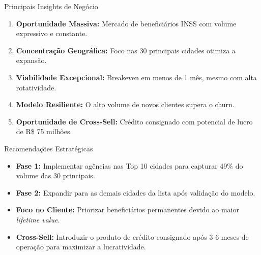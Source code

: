 \documentclass{beamer}
\begin{document}
\begin{frame}{Principais Insights de Negócio}
  \begin{enumerate}
    \item \textbf{Oportunidade Massiva:} Mercado de beneficiários INSS com volume expressivo e constante.
    \item \textbf{Concentração Geográfica:} Foco nas 30 principais cidades otimiza a expansão.
    \item \textbf{Viabilidade Excepcional:} Breakeven em menos de 1 mês, mesmo com alta rotatividade.
    \item \textbf{Modelo Resiliente:} O alto volume de novos clientes supera o churn.
    \item \textbf{Oportunidade de Cross-Sell:} Crédito consignado com potencial de lucro de R\$ 75 milhões.
  \end{enumerate}
\end{frame}

\begin{frame}{Recomendações Estratégicas}
  \begin{itemize}
    \item \textbf{Fase 1:} Implementar agências nas Top 10 cidades para capturar 49\% do volume das 30 principais.
    \item \textbf{Fase 2:} Expandir para as demais cidades da lista após validação do modelo.
    \item \textbf{Foco no Cliente:} Priorizar beneficiários permanentes devido ao maior \textit{lifetime value}.
    \item \textbf{Cross-Sell:} Introduzir o produto de crédito consignado após 3-6 meses de operação para maximizar a lucratividade.
  \end{itemize}
\end{frame}
\end{document}
